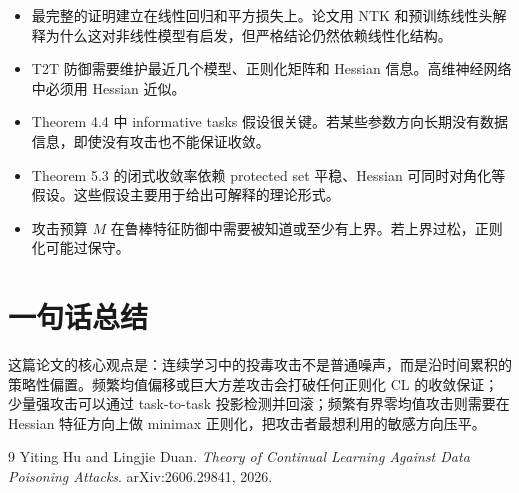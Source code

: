 \documentclass[UTF8,fontset=none,11pt]{ctexart}
\theoremstyle{cnstyle}
\begin{document}
\begin{itemize}
  \item 最完整的证明建立在线性回归和平方损失上。论文用 NTK 和预训练线性头解释为什么这对非线性模型有启发，但严格结论仍然依赖线性化结构。
  \item T2T 防御需要维护最近几个模型、正则化矩阵和 Hessian 信息。高维神经网络中必须用 Hessian 近似。
  \item Theorem 4.4 中 informative tasks 假设很关键。若某些参数方向长期没有数据信息，即使没有攻击也不能保证收敛。
  \item Theorem 5.3 的闭式收敛率依赖 protected set 平稳、Hessian 可同时对角化等假设。这些假设主要用于给出可解释的理论形式。
  \item 攻击预算 \(M\) 在鲁棒特征防御中需要被知道或至少有上界。若上界过松，正则化可能过保守。
\end{itemize}

\section{一句话总结}

这篇论文的核心观点是：连续学习中的投毒攻击不是普通噪声，而是沿时间累积的策略性偏置。频繁均值偏移或巨大方差攻击会打破任何正则化 CL 的收敛保证；少量强攻击可以通过 task-to-task 投影检测并回滚；频繁有界零均值攻击则需要在 Hessian 特征方向上做 minimax 正则化，把攻击者最想利用的敏感方向压平。

\begin{thebibliography}{9}
Yiting Hu and Lingjie Duan.
\newblock \emph{Theory of Continual Learning Against Data Poisoning Attacks}.
\newblock arXiv:2606.29841, 2026.
\end{thebibliography}
\end{document}
